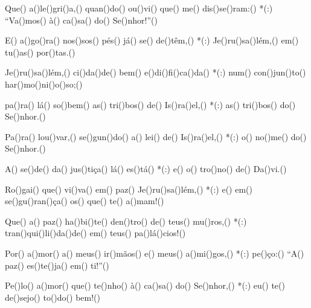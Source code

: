 Que() a()le()gri()a,() quan()do() ou()vi() que() me() dis()se()ram:() *(:)
``Va()mos() à() ca()sa() do() Se()nhor!''()

E() a()go()ra() nos()sos() pés() já() se() de()têm,() *(:)
Je()ru()sa()lém,() em() tu()as() por()tas.()

 Je()ru()sa()lém,() ci()da()de() bem() e()di()fi()ca()da() *(:)
num() con()jun()to() har()mo()ni()o()so;()

pa()ra() lá() so()bem() as() tri()bos() de() Is()ra()el,() *(:)
as() tri()bos() do() Se()nhor.()

Pa()ra() lou()var,() se()gun()do() a() lei() de() Is()ra()el,() *(:)
o() no()me() do() Se()nhor.()

 A() se()de() da() jus()tiça() lá() es()tá() *(:)
e() o() tro()no() de() Da()vi.()

 Ro()gai() que() vi()va() em() paz() Je()ru()sa()lém,() *(:)
e() em() se()gu()ran()ça() os() que() te() a()mam!()

 Que() a() paz() ha()bi()te() den()tro() de() teus() mu()ros,() *(:)
tran()qui()li()da()de() em() teus() pa()lá()cios!()

 Por() a()mor() a() meus() ir()mãos() e() meus() a()mi()gos,() *(:)
pe()ço:() ``A() paz() es()te()ja() em() ti!''()

 Pe()lo() a()mor() que() te()nho() à() ca()sa() do() Se()nhor,() *(:)
eu() te() de()sejo() to()do() bem!()